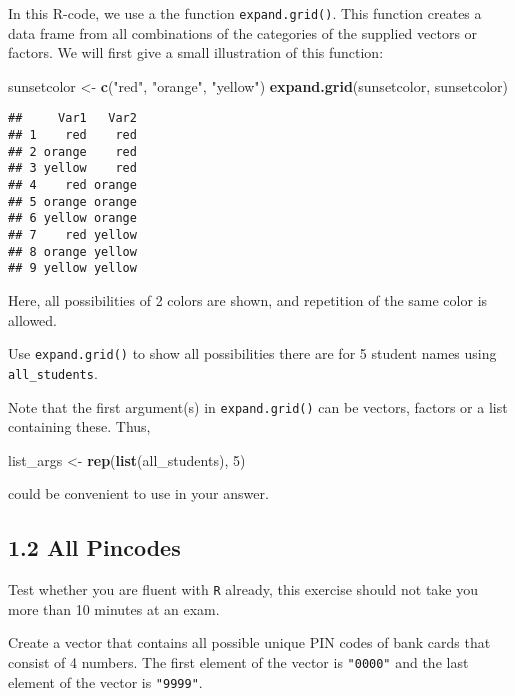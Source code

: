 \documentclass[]{article}
\newenvironment{Shaded}{\begin{snugshade}}{\end{snugshade}}
\newcommand{\DecValTok}[1]{\textcolor[rgb]{0.00,0.00,0.81}{#1}}
\newcommand{\KeywordTok}[1]{\textcolor[rgb]{0.13,0.29,0.53}{\textbf{#1}}}
\newcommand{\NormalTok}[1]{#1}
\newcommand{\StringTok}[1]{\textcolor[rgb]{0.31,0.60,0.02}{#1}}
\begin{document}
In this R-code, we use a the function \texttt{expand.grid()}. This
function creates a data frame from all combinations of the categories of
the supplied vectors or factors. We will first give a small illustration
of this function:

\begin{Shaded}
\begin{Highlighting}[]
\NormalTok{sunsetcolor <-}\StringTok{ }\KeywordTok{c}\NormalTok{(}\StringTok{"red"}\NormalTok{, }\StringTok{"orange"}\NormalTok{, }\StringTok{"yellow"}\NormalTok{)}
\KeywordTok{expand.grid}\NormalTok{(sunsetcolor, sunsetcolor)}
\end{Highlighting}
\end{Shaded}

\begin{verbatim}
##     Var1   Var2
## 1    red    red
## 2 orange    red
## 3 yellow    red
## 4    red orange
## 5 orange orange
## 6 yellow orange
## 7    red yellow
## 8 orange yellow
## 9 yellow yellow
\end{verbatim}

Here, all possibilities of 2 colors are shown, and repetition of the
same color is allowed.

Use \texttt{expand.grid()} to show all possibilities there are for 5
student names using \texttt{all\_students}.

Note that the first argument(s) in \texttt{expand.grid()} can be
vectors, factors or a list containing these. Thus,

\begin{Shaded}
\begin{Highlighting}[]
\NormalTok{list_args <-}\StringTok{ }\KeywordTok{rep}\NormalTok{(}\KeywordTok{list}\NormalTok{(all_students), }\DecValTok{5}\NormalTok{)}
\end{Highlighting}
\end{Shaded}

could be convenient to use in your answer.

\hypertarget{all-pincodes}{%
\subsection{1.2 All Pincodes}\label{all-pincodes}}

Test whether you are fluent with \texttt{R} already, this exercise
should not take you more than 10 minutes at an exam.

Create a vector that contains all possible unique PIN codes of bank
cards that consist of 4 numbers. The first element of the vector is
\texttt{"0000"} and the last element of the vector is \texttt{"9999"}.
\end{document}
